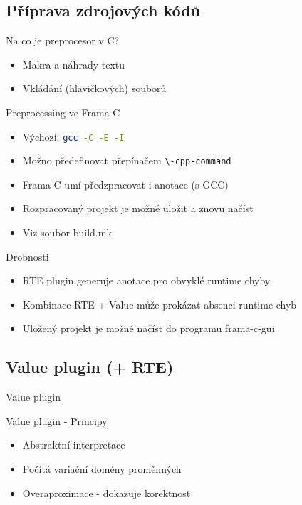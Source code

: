 \documentclass[11pt]{beamer}
\begin{document}
\subsection{Příprava zdrojových kódů}

\begin{frame}{Na co je preprocesor v C?}
\begin{itemize}
	\pause \item Makra a náhrady textu
	\pause \item Vkládání (hlavičkových) souborů
\end{itemize}
\end{frame}

\begin{frame}{Preprocessing ve Frama-C}
\begin{itemize}
	\item Výchozí: \lstinline[language=bash]{gcc -C -E -I}
	\item Možno předefinovat přepínačem \lstinline[language=bash]{\-cpp-command}
	\pause \item Frama-C umí předzpracovat i anotace (s GCC)
	\item Rozpracovaný projekt je možné uložit a znovu načíst
	\item Viz soubor build.mk
\end{itemize}
\end{frame}


\begin{frame}{Drobnosti}
	\begin{itemize}
		\item RTE plugin generuje anotace pro obvyklé runtime chyby
		\item Kombinace RTE + Value může prokázat absenci runtime chyb
		\item Uložený projekt je možné načíst do programu frama-c-gui
	\end{itemize}
\end{frame}

\subsection{Value plugin (+ RTE)}

\begin{frame}{Value plugin}

\end{frame}

\begin{frame}{Value plugin - Principy}
	\begin{itemize}
			\item Abstraktní interpretace
			\item Počítá variační domény proměnných
			\item Overaproximace - dokazuje korektnost
	\end{itemize}
\end{frame}
\end{document}
